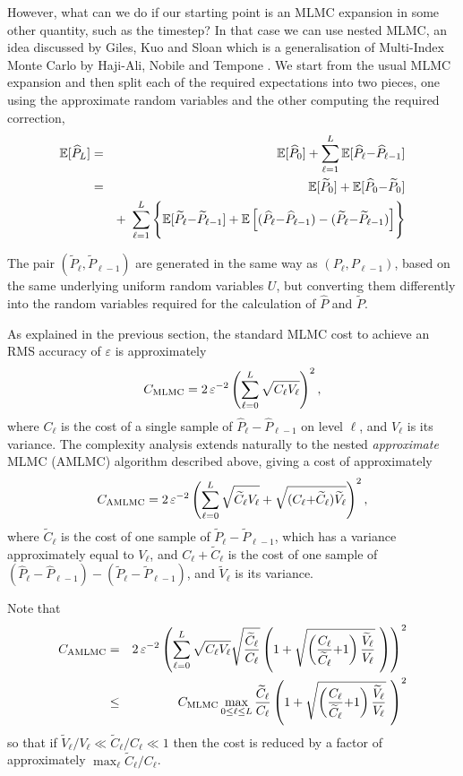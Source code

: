 \documentclass[11pt]{article}
\def \EE {{\mathbb{E}}}
\def \tP {{\widetilde{P}}}
\def \tC {{\widetilde{C}}}
\def \tV {{\widetilde{V}}}
\def \hP {{\widehat{P}}}
\def\eps{{\varepsilon}}
\begin{document}
However, what can we do if our starting point is an MLMC expansion in some 
other quantity, such as the timestep?  In that case we can use nested MLMC,
an idea discussed by Giles, Kuo and Sloan \cite{gks18} which is a generalisation of 
Multi-Index Monte Carlo by Haji-Ali, Nobile and Tempone \cite{hnt16}.
We start from the usual MLMC expansion and then split each of the required
expectations into two pieces, one using the approximate random variables and the
other computing the required correction,
\begin{eqnarray*}
\EE[ \hP_L ] &=& \EE[ \hP_0 ] + \sum_{\ell=1}^L \EE[ \hP_\ell {-} \hP_{\ell-1} ]\\
           &=& \EE[ \tP_0 ] + \EE[ \hP_0 {-}\tP_0 ] \\
& & +\ \sum_{\ell=1}^L \left\{\rule{0in}{0.22in}  \EE[ \tP_\ell {-} \tP_{\ell-1} ] + 
\EE\left[ (\hP_\ell {-} \hP_{\ell-1}) - (\tP_\ell {-} \tP_{\ell-1}) \right] \right\}
\end{eqnarray*}

The pair $(\tP_\ell, \tP_{\ell-1})$ are generated in the same way as
$(P_\ell, P_{\ell-1})$, based on the same underlying uniform random variables $U$,
but converting them differently into the random variables required for the
calculation of $\hP$ and $\tP$.


As explained in the previous section, the standard
MLMC cost to achieve an RMS accuracy of $\eps$ is approximately
\[
C_{\rm MLMC} = 2\, \eps^{-2} \left( \sum_{\ell=0}^L \sqrt{C_\ell V_\ell} \right)^2,
\]
where $C_\ell$ is the cost of a single sample of $\hP_\ell{-}\hP_{\ell-1}$
on level $\ell$, and $V_\ell$ is its variance.
The complexity analysis extends naturally to the nested
{\em approximate} MLMC (AMLMC)
algorithm described above, giving a cost of approximately
\[
C_{\rm AMLMC} = 2\, \eps^{-2} \left( \sum_{\ell=0}^L \sqrt{\tC_\ell V_\ell}
    + \sqrt{(C_\ell{+}\tC_\ell) \tV_\ell} \right)^2,
\]
where $\tC_\ell$ is the cost of one sample of $\tP_\ell{-}\tP_{\ell-1}$,
which has a variance approximately equal to $V_\ell$, and
$C_\ell{+}\tC_\ell$ is the cost of one sample of 
$(\hP_\ell{-}\hP_{\ell-1}) - (\tP_\ell{-}\tP_{\ell-1})$, and $\tV_\ell$ is
its variance.

Note that 
\begin{eqnarray*}
  C_{\rm AMLMC} &=& 2\, \eps^{-2} \left( \sum_{\ell=0}^L \sqrt{C_\ell V_\ell}
  \sqrt{\frac{\tC_\ell}{C_\ell}} \left( 1 
  + \sqrt{\left(\frac{C_\ell}{\tC_\ell}{+}1\right) \frac{\tV_\ell}{V_\ell}}\ \right)
   \right)^2\\
  &\leq & C_{\rm MLMC} \max_{0\leq\ell\leq L} \frac{\tC_\ell}{C_\ell}
  \left( 1+ \sqrt{\left(\frac{C_\ell}{\tC_\ell}{+}1\right) \frac{\tV_\ell}{V_\ell}}\ \right)^2
\end{eqnarray*}
so that if $\displaystyle \tV_\ell/V_\ell \ll \tC_\ell/C_\ell \ll 1$
then the cost is reduced by a factor of approximately
$\max_\ell  \tC_\ell/C_\ell$.
\end{document}
